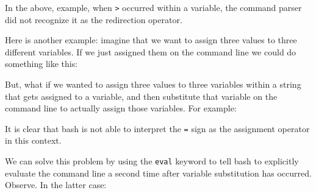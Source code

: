 \documentclass[]{krantz}
\makeatletter
\newenvironment{Shaded}{\begin{snugshade}}{\end{snugshade}}
\newcommand{\BuiltInTok}[1]{#1}
\newcommand{\CommentTok}[1]{\textcolor[rgb]{0.37,0.37,0.37}{\textit{#1}}}
\newcommand{\ExtensionTok}[1]{#1}
\newcommand{\KeywordTok}[1]{\textcolor[rgb]{0.27,0.27,0.27}{\textbf{#1}}}
\newcommand{\NormalTok}[1]{#1}
\newcommand{\StringTok}[1]{\textcolor[rgb]{0.5,0.5,0.5}{#1}}
\newcommand{\VariableTok}[1]{\textcolor[rgb]{0,0,0}{#1}}
\newenvironment{kframe}{%
\medskip{}
\setlength{\fboxsep}{.8em}
 \def\at@end@of@kframe{}%
 \ifinner\ifhmode%
  \def\at@end@of@kframe{\end{minipage}}%
  \begin{minipage}{\columnwidth}%
 \fi\fi%
 \def\FrameCommand##1{\hskip\@totalleftmargin \hskip-\fboxsep
 \colorbox{shadecolor}{##1}\hskip-\fboxsep
     \hskip-\linewidth \hskip-\@totalleftmargin \hskip\columnwidth}%
 \MakeFramed {\advance\hsize-\width
   \@totalleftmargin\z@ \linewidth\hsize
   \@setminipage}}%
 {\par\unskip\endMakeFramed%
 \at@end@of@kframe}
\renewenvironment{Shaded}{\begin{kframe}}{\end{kframe}}
\makeatother
\begin{document}
In the above, example, when \texttt{\textgreater{}} occurred within a variable,
the command parser did not recognize it as the redirection
operator.

Here is another example: imagine that we want to assign three values to
three different variables. If we just assigned them on the command line
we could do something like this:

\begin{Shaded}
\end{Shaded}

But, what if we wanted to assign three values to three variables
within a string that gets assigned to a variable, and
then substitute that variable on the command line to actually assign those
variables. For example:

\begin{Shaded}
\end{Shaded}

It is clear that bash is not able to interpret the \texttt{=} sign as the assignment
operator in this context.

We can solve this problem by using the \texttt{eval} keyword to tell bash to
explicitly evaluate the command
line a second time after variable substitution has occurred.
Observe. In the latter case:

\begin{Shaded}
\end{Shaded}
\end{document}
